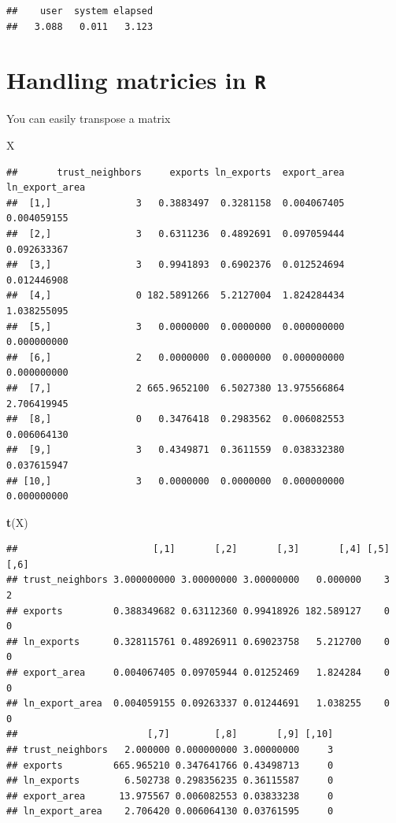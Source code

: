 \documentclass[]{book}
\newenvironment{Shaded}{\begin{snugshade}}{\end{snugshade}}
\newcommand{\KeywordTok}[1]{\textcolor[rgb]{0.13,0.29,0.53}{\textbf{#1}}}
\newcommand{\NormalTok}[1]{#1}
\theoremstyle{definition}
\theoremstyle{definition}
\theoremstyle{definition}
\theoremstyle{remark}
\begin{document}
\begin{verbatim}
##    user  system elapsed 
##   3.088   0.011   3.123
\end{verbatim}

\hypertarget{handling-matricies-in-r}{%
\section{\texorpdfstring{Handling matricies in \texttt{R}}{Handling matricies in R}}\label{handling-matricies-in-r}}

You can easily transpose a matrix

\begin{Shaded}
\begin{Highlighting}[]
\NormalTok{X}
\end{Highlighting}
\end{Shaded}

\begin{verbatim}
##       trust_neighbors     exports ln_exports  export_area ln_export_area
##  [1,]               3   0.3883497  0.3281158  0.004067405    0.004059155
##  [2,]               3   0.6311236  0.4892691  0.097059444    0.092633367
##  [3,]               3   0.9941893  0.6902376  0.012524694    0.012446908
##  [4,]               0 182.5891266  5.2127004  1.824284434    1.038255095
##  [5,]               3   0.0000000  0.0000000  0.000000000    0.000000000
##  [6,]               2   0.0000000  0.0000000  0.000000000    0.000000000
##  [7,]               2 665.9652100  6.5027380 13.975566864    2.706419945
##  [8,]               0   0.3476418  0.2983562  0.006082553    0.006064130
##  [9,]               3   0.4349871  0.3611559  0.038332380    0.037615947
## [10,]               3   0.0000000  0.0000000  0.000000000    0.000000000
\end{verbatim}

\begin{Shaded}
\begin{Highlighting}[]
\KeywordTok{t}\NormalTok{(X)}
\end{Highlighting}
\end{Shaded}

\begin{verbatim}
##                        [,1]       [,2]       [,3]       [,4] [,5] [,6]
## trust_neighbors 3.000000000 3.00000000 3.00000000   0.000000    3    2
## exports         0.388349682 0.63112360 0.99418926 182.589127    0    0
## ln_exports      0.328115761 0.48926911 0.69023758   5.212700    0    0
## export_area     0.004067405 0.09705944 0.01252469   1.824284    0    0
## ln_export_area  0.004059155 0.09263337 0.01244691   1.038255    0    0
##                       [,7]        [,8]       [,9] [,10]
## trust_neighbors   2.000000 0.000000000 3.00000000     3
## exports         665.965210 0.347641766 0.43498713     0
## ln_exports        6.502738 0.298356235 0.36115587     0
## export_area      13.975567 0.006082553 0.03833238     0
## ln_export_area    2.706420 0.006064130 0.03761595     0
\end{verbatim}
\end{document}
